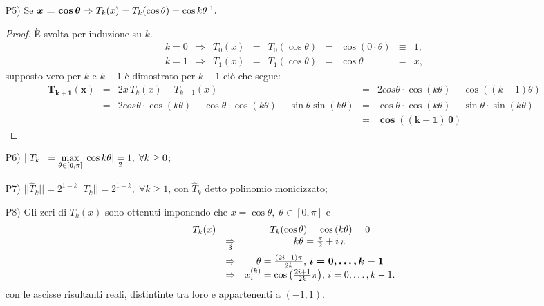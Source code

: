 \begin{itemize}
    \item[P5)] Se $\boldsymbol{x=\cos\theta}\Rightarrow T_k(x)=T_k(\cos\theta)=\cos{k\theta}\;\footnotemark.$
    \begin{proof}
        È svolta per induzione su $k$.
        \begin{equation*}
            \begin{matrix}
                k=0&\Rightarrow& T_0(x) &=& T_0(\cos\theta) &=& \cos{(0\cdot\theta)} &\equiv& 1,\\
                k=1 &\Rightarrow& T_1(x) &=& T_1(\cos\theta) &=& \cos\theta &=& x,
            \end{matrix}
        \end{equation*}
        supposto vero per $k$ e $k-1$ è dimostrato per $k+1$ ciò che segue:
        \begin{equation*}
            \begin{matrix}
                \boldsymbol{T_{k+1}(x)}&\boldsymbol =& 2x\,T_k(x)-T_{k-1}(x) &=& 2cos\theta\cdot\cos{(k\theta)}-\cos{((k-1)\theta)}\\
                &=&2cos\theta\cdot\cos{(k\theta)}-\cos\theta\cdot\cos{(k\theta)}-\sin\theta\sin{(k\theta)} &=& \cos\theta\cdot\cos{(k\theta)}-\sin\theta\cdot\sin{(k\theta)}\\
                &&&=&\boldsymbol{\cos{((k+1)\,\theta)}}
            \end{matrix}
        \end{equation*}
    \end{proof}
    \item[P6)]\footnotemark $||T_k||=\underset{\theta\in [0,\pi]}{\max}|\cos{k\theta}|
    \underset{\footnotemark}{=} 1,\;\forall k\geq 0$;
    \addtocounter{footnote}{-1}
    \item[P7)]$||\widehat T_k||=2^{1-k}||T_k||=2^{1-k},\;\forall k\geq 1$, con $\widehat T_k$ detto polinomio monicizzato;
    \item[P8)] Gli zeri di $T_k(x)$ sono ottenuti imponendo che $x=\cos\theta,\;\theta\in [0,\pi]$ e 
    \begin{equation*}
        \begin{matrix}
            T_k(x)&=&T_k(\cos\theta)=\cos{(k\theta)}=0\\
            &\underset{\footnotemark}{\Rightarrow}& k\theta=\frac{\pi}{2}+i\,\pi\\
            &\Rightarrow&\theta =\frac{(2i+1)\pi}{2k},\, \boldsymbol{i=0,\hdots,k-1}\\
            &\Rightarrow& x_i^{(k)} = \cos{\left(\frac{2i+1}{2k}\pi\right)},\, i=0,\hdots,k-1.
        \end{matrix}
    \end{equation*}
    con le ascisse risultanti reali, distintinte tra loro e appartenenti a $(-1,1)$.
\end{itemize}


